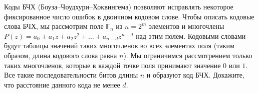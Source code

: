 Коды БЧХ (Боуза--Чоудхури--Хоквингема) позволяют исправлять некоторое фиксированное число ошибок в
двоичном кодовом слове. Чтобы описать кодовые слова БЧХ, мы рассмотрим поле $\mathbb{F}_n$ из $n = 2^m$
элементов и многочлены $P(z) = a_0 + a_1 z + a_2 z^2 + \dots + a_{n - d} z^{n - d}$ над этим
полем. Кодовыми словами будут таблицы значений таких многочленов во всех элементах поля (таким образом,
длина кодового слова равна $n$). Мы ограничимся рассмотрением только таких многочленов, которые в каждой
точке поля принимают значение $0$ или $1$. Все такие последовательности битов длины $n$ и образуют код
БЧХ. Докажите, что расстояние данного кода не менее $d$.